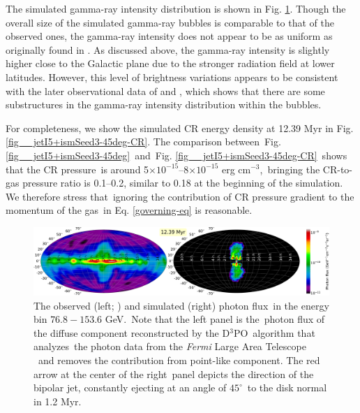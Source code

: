 \documentclass[fleqn,usenatbib,useAMS]{mnras}
\begin{document}
 The simulated gamma-ray intensity
 distribution is shown in Fig. \ref{fig__gammaRay-map}. Though the overall size of the simulated gamma-ray bubbles is comparable to that of the observed ones, the gamma-ray intensity does not appear to be
 as uniform as originally found in \citet{Su2012}.
 As discussed above, the gamma-ray intensity is slightly
 higher close to the Galactic plane due to the stronger
 radiation field at lower latitudes. However, this level
 of brightness variations appears to be consistent with the later
 observational data of \citet{Ackermann2014} and \citet{Selig2015}, which shows that there are some substructures in the gamma-ray intensity distribution within the bubbles.

 For completeness, we show the simulated CR energy density at 12.39 Myr in Fig. \ref{fig__jetI5+ismSeed3-45deg-CR}. The comparison between\
 Fig. \ref{fig__jetI5+ismSeed3-45deg}\
 and\
 Fig. \ref{fig__jetI5+ismSeed3-45deg-CR}\
 shows that the CR pressure\
 is around 5$\times10^{-15}$--8$\times10^{-15}$ erg cm$^{-3}$,\
 bringing the CR-to-gas pressure ratio is 0.1--0.2,
 similar to 0.18 at the beginning of the simulation.
 We therefore stress that\
 ignoring the contribution of CR pressure gradient to the momentum of the gas\
 in Eq. \ref{governing-eq} is reasonable.




\begin{figure}
  \includegraphics[width=\linewidth]{figures/fig__GammaRay_100e9_1e6_angle_000.png}
  \caption{The observed (left; \citealt{Selig2015}) and simulated (right) photon flux\
           in the energy bin $76.8-153.6$ GeV.\
           Note that the left panel is the\
           photon flux of the diffuse component reconstructed by the D$^3$PO\
           algorithm \citep{Selig2015} that analyzes\
           the photon data from the \textit{Fermi} Large Area Telescope \citep{Atwood2009}\
           and removes the contribution from point-like component.
           The red arrow at the center of the right\
           panel depicts the direction of the bipolar jet, constantly ejecting at an angle of $45^{\circ}$\
           to the disk normal in 1.2 Myr.
  }
  \label{fig__gammaRay-map}
\end{figure}
\end{document}
